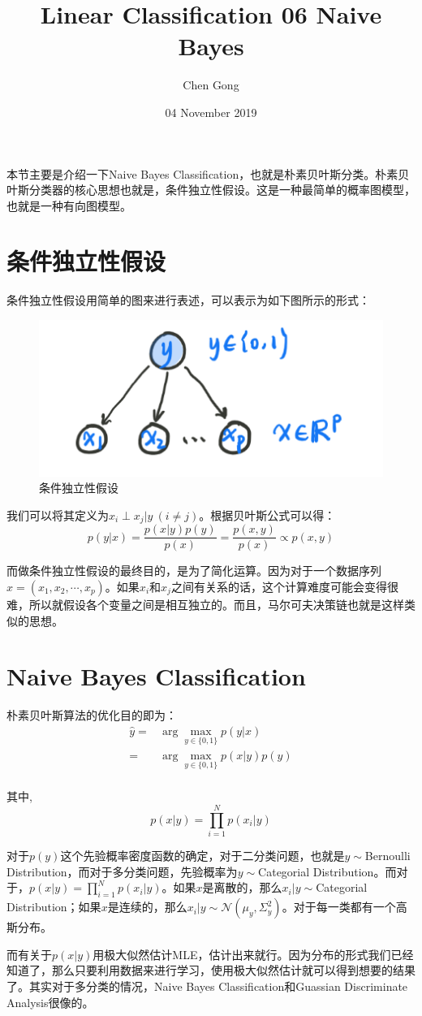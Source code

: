 \documentclass[a4paper]{article}
\title{Linear Classification 06 Naive Bayes}
\author{Chen Gong}
\date{04 November 2019}
\begin{document}
\maketitle

本节主要是介绍一下Naive Bayes Classification，也就是朴素贝叶斯分类。朴素贝叶斯分类器的核心思想也就是，条件独立性假设。这是一种最简单的概率图模型，也就是一种有向图模型。

\section{条件独立性假设}
条件独立性假设用简单的图来进行表述，可以表示为如下图所示的形式：
\begin{figure}[H]
    \centering
    \includegraphics[width=.55\textwidth]{微信图片_20191104091918.png}
    \caption{条件独立性假设}
    \label{fig:my_label_1}
\end{figure}

我们可以将其定义为$x_i\perp x_j|y\ (i \neq j)$。根据贝叶斯公式可以得：
\begin{equation}
    p(y|x)=\frac{p(x|y)p(y)}{p(x)}=\frac{p(x,y)}{p(x)}\propto p(x,y)
\end{equation}

而做条件独立性假设的最终目的，是为了简化运算。因为对于一个数据序列$x=(x_1,x_2,\cdots,x_p)$。如果$x_i$和$x_j$之间有关系的话，这个计算难度可能会变得很难，所以就假设各个变量之间是相互独立的。而且，马尔可夫决策链也就是这样类似的思想。

\section{Naive Bayes Classification}
朴素贝叶斯算法的优化目的即为：
\begin{equation}
    \begin{split}
        \hat{y} = & \arg\max_{y\in \{0,1\}}p(y|x) \\
        = & \arg\max_{y\in \{0,1\}}p(x|y)p(y) \\
    \end{split}
\end{equation}

其中,
\begin{equation}
    p(x|y) = \prod_{i=1}^Np(x_i|y)
\end{equation}

对于$p(y)$这个先验概率密度函数的确定，对于二分类问题，也就是$y\sim$Bernoulli Distribution，而对于多分类问题，先验概率为$y\sim$Categorial Distribution。而对于，$p(x|y) = \prod_{i=1}^Np(x_i|y)$。如果$x$是离散的，那么$x_i|y\sim$Categorial Distribution；如果$x$是连续的，那么$x_i|y\sim\mathcal{N}(\mu_y,\Sigma^2_y)$。对于每一类都有一个高斯分布。

而有关于$p(x|y)$用极大似然估计MLE，估计出来就行。因为分布的形式我们已经知道了，那么只要利用数据来进行学习，使用极大似然估计就可以得到想要的结果了。其实对于多分类的情况，Naive Bayes Classification和Guassian Discriminate Analysis很像的。
\end{document}
